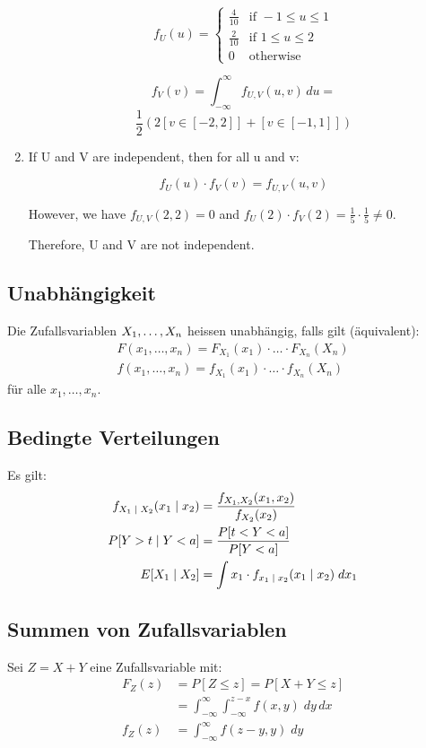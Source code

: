 \begin{tiny}
\begin{enumerate}[noitemsep,topsep=0pt,parsep=0pt,partopsep=0pt]
\[
  f_U(u) = \begin{cases}
    \frac{4}{10} & \text{if } -1 \leq u \leq 1 \\
    \frac{2}{10} & \text{if } 1 \leq u \leq 2  \\
    0            & \text{otherwise}
  \end{cases}
\]

\[
  f_V(v) = \int_{-\infty}^{\infty} f_{U,V}(u,v) \, du =
\]
\[
  \frac{1}{2}\left(2[v \in [-2,2]] + [v \in [-1,1]]\right)
\]

\item If U and V are independent, then for all u and v:

\[
  f_U(u) \cdot f_V(v) = f_{U,V}(u,v)
\]

However, we have \(f_{U,V}(2,2) = 0\) and \(f_U(2) \cdot f_V(2) = \frac{1}{5}
\cdot \frac{1}{5} \neq 0\).

Therefore, U and V are not independent.
\end{enumerate}
\end{tiny}
\BoxEnd{}
\subsection{Unabhängigkeit}
Die Zufallsvariablen $X_1, \dots, X_n$ heissen unabhängig, falls gilt
(äquivalent):
\begin{align*}
  F (x_1, \dots, x_n) = F_{X_1} (x_1) \cdot \hdots \cdot F_{X_n} (X_n) \\
  f (x_1, \dots, x_n) = f_{X_1} (x_1) \cdot \hdots \cdot f_{X_n} (X_n)
\end{align*}
für alle $x_1, \dots, x_n$.
\subsection{Bedingte Verteilungen}
Es gilt:
\begin{align*}
  f_{X_1 \; | \; X_2} (x_1 \; | \; x_2) & = \frac{f_{X_1,  X_2} (x_1,  x_2)}{f_{X_2} (x_2)}              \\
  P[Y > t \; | \; Y < a]                   & = \frac{P[t < Y < a]}{P[Y < a]}                                \\
  E[X_1 \; | \; X_2]                    & = \int x_1 \cdot f_{x_1 \; | \; x_2} (x_1 \; | \; x_2) \; dx_1
\end{align*}
\subsection{Summen von Zufallsvariablen}
Sei $Z = X + Y$ eine Zufallsvariable mit:
\begin{align*}
  F_Z (z) & = P[Z \leq z] = P[X + Y \leq z]                                     \\
          & = \int_{-\infty}^\infty \int_{-\infty}^{z - x} f (x, y )\; dy \, dx \\
  f_Z (z) & = \int_{-\infty}^\infty f (z - y, y) \; dy
\end{align*}
